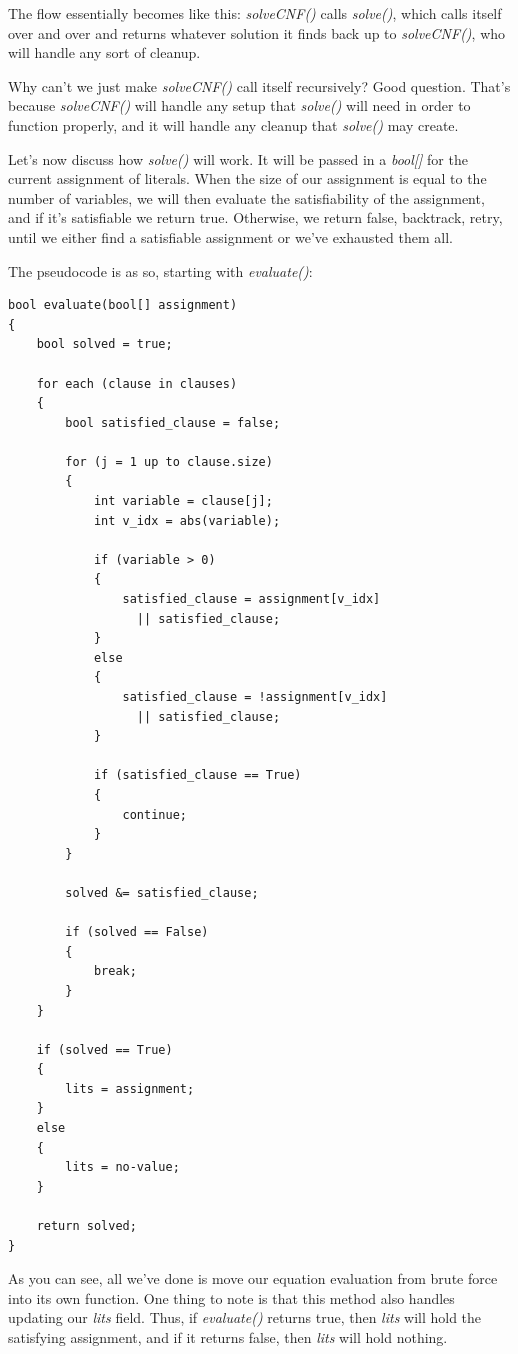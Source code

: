 \documentclass[oneside]{book}
\begin{document}
The flow essentially becomes like this: \textit{solveCNF()} calls
\textit{solve()}, which calls itself over and over and returns whatever solution
it finds back up to \textit{solveCNF()}, who will handle any sort of cleanup.

Why can't we just make \textit{solveCNF()} call itself recursively? Good question.
That's because \textit{solveCNF()} will handle any setup that
\textit{solve()} will need in order to function properly, and it will handle any
cleanup that \textit{solve()} may create.

Let's now discuss how \textit{solve()} will work.
It will be passed in a \textit{bool[]} for the current assignment of literals.
When the size of our assignment is equal to the number of variables, we will
then evaluate the satisfiability of the assignment, and if it's satisfiable we
return true. Otherwise, we return false, backtrack, retry, until we either find a
satisfiable assignment or we've exhausted them all.

The pseudocode is as so, starting with \textit{evaluate()}:

\begin{lstlisting}
bool evaluate(bool[] assignment)
{
    bool solved = true;

    for each (clause in clauses)
    {
        bool satisfied_clause = false;

        for (j = 1 up to clause.size)
        {
            int variable = clause[j];
            int v_idx = abs(variable);

            if (variable > 0)
            {
                satisfied_clause = assignment[v_idx]
                  || satisfied_clause;
            }
            else
            {
                satisfied_clause = !assignment[v_idx] 
                  || satisfied_clause;
            }

            if (satisfied_clause == True)
            {
                continue;
            }
        }

        solved &= satisfied_clause;

        if (solved == False)
        {
            break;
        }
    }

    if (solved == True)
    {
        lits = assignment;
    }
    else
    {
        lits = no-value;
    }

    return solved;
}
\end{lstlisting}

As you can see, all we've done is move our equation evaluation from brute force
into its own function. One thing to note is that this method also handles
updating our \textit{lits} field. Thus, if \textit{evaluate()} returns true, then
\textit{lits} will hold the satisfying assignment, and if it returns false, then
\textit{lits} will hold nothing.
\end{document}
